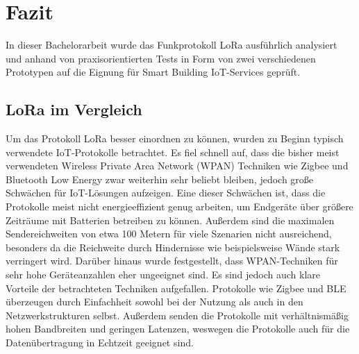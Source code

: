 \chapter{Fazit}
\label{cha:fazit}

In dieser Bachelorarbeit wurde das Funkprotokoll LoRa ausführlich analysiert und anhand von praxisorientierten Tests in Form von zwei verschiedenen Prototypen auf die Eignung für Smart Building IoT-Services geprüft.

\section{LoRa im Vergleich}

Um das Protokoll LoRa besser einordnen zu können, wurden zu Beginn typisch verwendete IoT-Protokolle betrachtet. Es fiel schnell auf, dass die bisher meist verwendeten Wireless Private Area Network (WPAN) Techniken wie Zigbee und Bluetooth Low Energy zwar weiterhin sehr beliebt bleiben, jedoch große Schwächen für IoT-Lösungen aufzeigen. Eine dieser Schwächen ist, dass die Protokolle meist nicht energieeffizient genug arbeiten, um Endgeräte über größere Zeiträume mit Batterien betreiben zu können. Außerdem sind die maximalen Sendereichweiten von etwa 100 Metern für viele Szenarien nicht ausreichend, besonders da die Reichweite durch Hindernisse wie beispielsweise Wände stark verringert wird. Darüber hinaus wurde festgestellt, dass WPAN-Techniken für sehr hohe Geräteanzahlen eher ungeeignet sind. Es sind jedoch auch klare Vorteile der betrachteten Techniken aufgefallen. Protokolle wie Zigbee und BLE überzeugen durch Einfachheit sowohl bei der Nutzung als auch in den Netzwerkstrukturen selbst. Außerdem senden die Protokolle mit verhältnismäßig hohen Bandbreiten und geringen Latenzen, weswegen die Protokolle auch für die Datenübertragung in Echtzeit geeignet sind.

